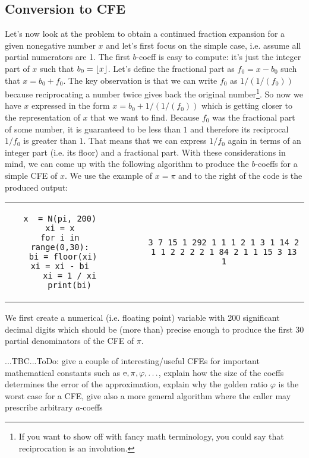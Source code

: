 \subsection{Conversion to CFE}
Let's now look at the problem to obtain a continued fraction expansion for a given nonegative number $x$ and let's first focus on the simple case, i.e. assume all partial numerators are 1. The first $b$-coeff is easy to compute: it's just the integer part of $x$ such that $b_0 = \lfloor x\rfloor$. Let's define the fractional part as $f_0 = x - b_0$ such that $x = b_0 + f_0$. The key observation is that we can write $f_0$ as $1/(1/(f_0))$ because reciprocating a number twice gives back the original number\footnote{If you want to show off with fancy math terminology, you could say that reciprocation is an involution.}. So now we have $x$ expressed in the form $x = b_0 + 1/(1/(f_0))$ which is getting closer to the representation of $x$ that we want to find. Because $f_0$ was the fractional part of some number, it is guaranteed to be less than $1$ and therefore its reciprocal $1/f_0$ is greater than $1$. That means that we can express $1/f_0$ again in terms of an integer part (i.e. its floor) and a fractional part. With these considerations in mind, we can come up with the following algorithm to produce the $b$-coeffs for a simple CFE of $x$. We use the example of $x = \pi$ and to the right of the code is the produced output:
\begin{center}
\begin{tabular}{ ccccc } 
\begin{lstlisting}
x  = N(pi, 200)
xi = x
for i in range(0,30):
    bi = floor(xi)   
    xi = xi - bi    
    xi = 1 / xi
    print(bi)
\end{lstlisting}
& & \vline & &
\begin{lstlisting}
3 7 15 1 292 1 1 1 2 1 3 1 14 2 
1 1 2 2 2 2 1 84 2 1 1 15 3 13 1
\end{lstlisting}
\end{tabular}
\end{center}
We first create a numerical (i.e. floating point) variable with 200 significant decimal digits which should be (more than) precise enough to produce the first 30 partial denominators of the CFE of $\pi$.

...TBC...ToDo: give a couple of interesting/useful CFEs for important mathematical constants such as $\operatorname{\mathrm{e}}, \pi, \varphi, \ldots$, explain how the size of the coeffs determines the error of the approximation, explain why the golden ratio $\varphi$ is the worst case for a CFE, give also a more general algorithm where the caller may prescribe arbitrary $a$-coeffs

